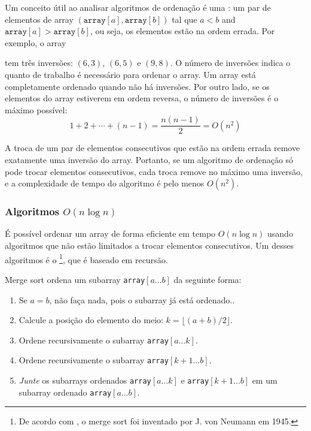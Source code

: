 Um conceito útil ao analisar algoritmos de ordenação é uma :
um par de elementos de array
$(\texttt{array}[a],\texttt{array}[b])$ tal que
$a<b$ and $\texttt{array}[a]>\texttt{array}[b]$,
ou seja, os elementos estão na ordem errada. 
Por exemplo, o array
\begin{center}
\end{center}
tem três inversões: $(6,3)$, $(6,5)$ e $(9,8)$.
O número de inversões indica o quanto de trabalho é necessário para ordenar o array. 
Um array está completamente ordenado quando não há inversões.
Por outro lado, se os elementos do array estiverem em ordem reversa, o número de inversões é o máximo possível:
\[1+2+\cdots+(n-1)=\frac{n(n-1)}{2} = O(n^2)\]

A troca de um par de elementos consecutivos que estão na ordem errada remove exatamente uma inversão do array.
Portanto, se um algoritmo de ordenação só pode trocar elementos consecutivos, cada troca remove no máximo uma inversão, e a complexidade de tempo do algoritmo é pelo menos $O(n^2)$.

\subsubsection{Algoritmos $O(n \log n)$}


É possível ordenar um array de forma eficiente em
tempo $O(n \log n)$ usando algoritmos que não estão limitados a trocar elementos consecutivos.
Um desses algoritmos é o \footnote{De acordo com \cite{knu983},
o merge sort foi inventado por J. von Neumann em 1945.},
que é baseado em recursão.


Merge sort ordena um subarray \texttt{array}$[a \ldots b]$ da seguinte forma:

\begin{enumerate}
\item Se $a=b$, não faça nada, pois o subarray já está ordenado..
\item Calcule a posição do elemento do meio: $k=\lfloor (a+b)/2 \rfloor$.
\item Ordene recursivamente o subarray \texttt{array}$[a \ldots k]$.
\item Ordene recursivamente o subarray \texttt{array}$[k+1 \ldots b]$.
\item \emph{Junte} os subarrays ordenados \texttt{array}$[a \ldots k]$ e
\texttt{array}$[k+1 \ldots b]$
em um subarray ordenado \texttt{array}$[a \ldots b]$.
\end{enumerate}

